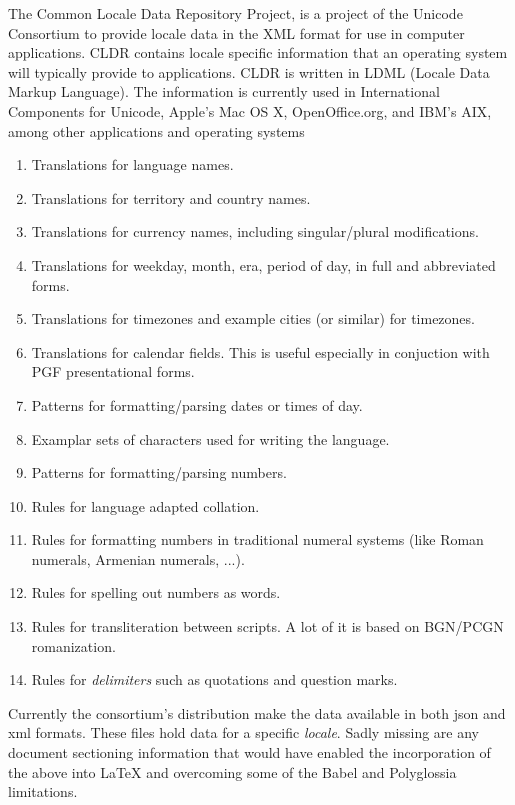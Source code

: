 The Common Locale Data Repository Project, is a project of the Unicode Consortium to provide locale data in the XML format for use in computer applications. CLDR contains locale specific information that an operating system will typically provide to applications. CLDR is written in LDML (Locale Data Markup Language). The information is currently used in International Components for Unicode, Apple's Mac OS X, OpenOffice.org, and IBM's AIX, among other applications and operating systems

\begin{enumerate}
\item Translations for language names.
\item Translations for territory and country names.
\item Translations for currency names, including singular/plural modifications.
\item Translations for weekday, month, era, period of day, in full and abbreviated forms.
\item Translations for timezones and example cities (or similar) for timezones.
\item Translations for calendar fields. This is useful especially in conjuction with PGF presentational forms.
\item Patterns for formatting/parsing dates or times of day.
\item Examplar sets of characters used for writing the language.
\item Patterns for formatting/parsing numbers.
\item Rules for language adapted collation. \label{collation}
\item Rules for formatting numbers in traditional numeral systems (like Roman numerals, Armenian numerals, ...).
\item Rules for spelling out numbers as words.
\item Rules for transliteration between scripts. A lot of it is based on BGN/PCGN romanization.
\item Rules for \emph{delimiters} such as quotations and question marks.
\end{enumerate}

Currently the consortium’s distribution make the data available in both json and xml formats.  These files hold data for a specific \emph{locale}. Sadly missing are any document sectioning information that would have enabled the incorporation of the above into LaTeX and overcoming some of the Babel and Polyglossia limitations.

